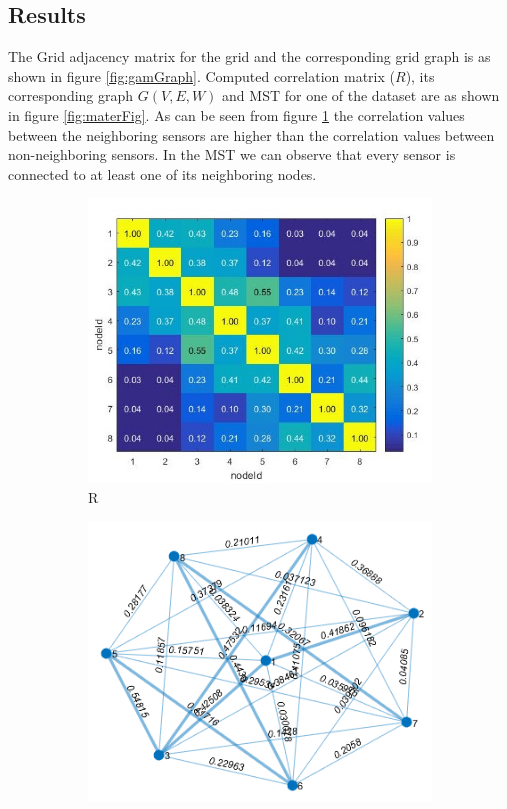 \subsection{Results}
The Grid adjacency matrix for the grid and the corresponding grid graph is as shown in figure \ref{fig:gamGraph}. Computed correlation matrix ($R$), its corresponding graph $G(V,E,W)$ and MST for one of the dataset are as shown in figure \ref{fig:materFig}. 
As can be seen from figure \ref{fig:corrMatrix} the correlation values between the neighboring sensors are higher than the correlation values between non-neighboring sensors. In the MST we can observe that every sensor is connected to at least one of its neighboring nodes.

\begin{figure}[!ht]
\begin{subfigure}[b]{\textwidth}
\includegraphics[scale=0.75]{./pics/correlation.jpg}
\caption{R}
\centering
\label{fig:corrMatrix}
\end{subfigure}
\hfill
\begin{subfigure}[b]{0.5\textwidth}
\includegraphics[scale=0.5]{./pics/corrTree.jpg}

\end{subfigure}
\end{figure}
